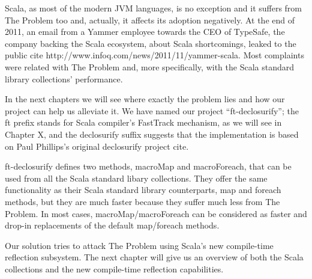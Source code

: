 Scala, as most of the modern JVM languages, is no exception and it suffers from
The Problem too and, actually, it affects its adoption negatively. At the end of
2011, an email from a Yammer employee towards the CEO of TypeSafe, the company
backing the Scala ecosystem, about Scala shortcomings, leaked to the public
{cite http://www.infoq.com/news/2011/11/yammer-scala}. Most complaints were
related with The Problem and, more specifically, with the Scala standard
library collections' performance. 

In the next chapters we will see where exactly the problem lies and how
our project can help us alleviate it. We have named our project
``ft-declosurify''; the ft prefix stands for Scala compiler's FastTrack
mechanism, as we will see in Chapter X, and the declosurify suffix suggests that
the implementation is based on Paul Phillips's original declosurify project
{cite}. 

ft-declosurify defines two methods, macroMap and macroForeach, that can be used
from all the Scala standard libary collections. They offer the same
functionality as their Scala standard library counterparts, map and foreach
methods, but they are much faster because they suffer much less from The
Problem. In most cases, macroMap/macroForeach can be considered as faster and
drop-in replacements of the default map/foreach methods.

Our solution tries to attack The Problem using Scala's new compile-time
reflection subsystem. The next chapter will give us an overview of both the
Scala collections and the new compile-time reflection capabilities.

